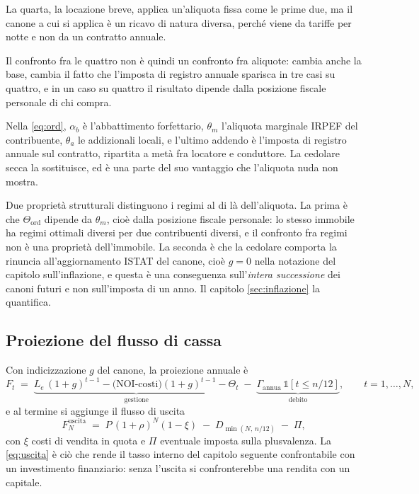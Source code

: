 \documentclass[11pt,a4paper]{article}
\theoremstyle{definition}
\theoremstyle{plain}
\begin{document}
La quarta, la locazione breve, applica un'aliquota fissa come le prime due, ma il canone a cui si applica è un ricavo di natura diversa, perché viene da tariffe per notte e non da un contratto annuale.

Il confronto fra le quattro non è quindi un confronto fra aliquote: cambia anche la base, cambia il fatto che l'imposta di registro annuale sparisca in tre casi su quattro, e in un caso su quattro il risultato dipende dalla posizione fiscale personale di chi compra.

Nella \eqref{eq:ord}, $\alpha_b$ è l'abbattimento forfettario, $\theta_m$ l'aliquota marginale IRPEF del contribuente, $\theta_a$ le addizionali locali, e l'ultimo addendo è l'imposta di registro annuale sul contratto, ripartita a metà fra locatore e conduttore. La cedolare secca la sostituisce, ed è una parte del suo vantaggio che l'aliquota nuda non mostra.

Due proprietà strutturali distinguono i regimi al di là dell'aliquota. La prima è che $\Theta_{\text{ord}}$ dipende da $\theta_m$, cioè dalla posizione fiscale personale: lo stesso immobile ha regimi ottimali diversi per due contribuenti diversi, e il confronto fra regimi non è una proprietà dell'immobile. La seconda è che la cedolare comporta la rinuncia all'aggiornamento ISTAT del canone, cioè $g=0$ nella notazione del capitolo sull'inflazione, e questa è una conseguenza sull'\emph{intera successione} dei canoni futuri e non sull'imposta di un anno. Il capitolo \ref{sec:inflazione} la quantifica.

\subsection{Proiezione del flusso di cassa}

Con indicizzazione $g$ del canone, la proiezione annuale è
\begin{equation}
F_t \;=\; \underbrace{L_e\,(1+g)^{t-1} - \big(\mathrm{NOI}\text{-costi}\big)(1+g)^{t-1} - \Theta_t}_{\text{gestione}} \;-\; \underbrace{\Gamma_{\text{annua}}\,\mathbb{1}[t\le n/12]}_{\text{debito}},
\qquad t=1,\dots,N,
\label{eq:proiezione}
\end{equation}
e al termine si aggiunge il flusso di uscita
\begin{equation}
F_N^{\text{uscita}} \;=\; P\,(1+\rho)^N (1-\xi) \;-\; D_{\min(N,\,n/12)} \;-\; \Pi,
\label{eq:uscita}
\end{equation}
con $\xi$ costi di vendita in quota e $\Pi$ eventuale imposta sulla plusvalenza. La \eqref{eq:uscita} è ciò che rende il tasso interno del capitolo seguente confrontabile con un investimento finanziario: senza l'uscita si confronterebbe una rendita con un capitale.
\end{document}
